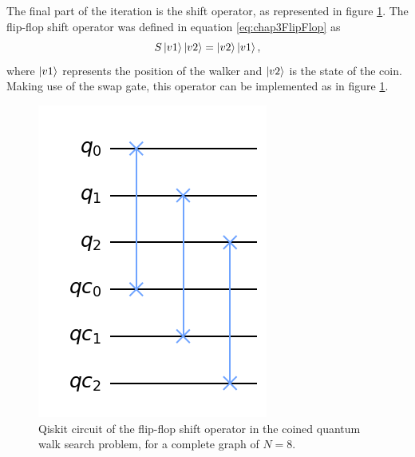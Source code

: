 \documentclass[../../dissertation.tex]{subfiles}
\begin{document}
The final part of the iteration is the shift operator, as represented in figure
\ref{fig:coinedQWSearchShiftCircuitQistkit}. The flip-flop shift operator was
defined in equation \eqref{eq:chap3FlipFlop} as
\begin{equation}
        S\ket{v1}\ket{v2} = \ket{v2}\ket{v1},
        \label{eq:chap4FlipFlop}
\end{equation}
where $\ket{v1}$ represents the position of the walker and $\ket{v2}$ is the
state of the coin. Making use of the swap gate, this operator can be
implemented as in figure \ref{fig:coinedQWSearchShiftCircuitQistkit}.
\begin{figure}[!h]
	\centering
	\includegraphics[scale=0.27]{img/Qiskit/CoinedQuantumWalk/Search/Circuits/CoinedSearchQiskitCircShift_N3_M4_S5.png}
	\caption{Qiskit circuit of the  flip-flop shift operator in the coined quantum walk search problem, for a complete graph of $N=8$.} 
	\label{fig:coinedQWSearchShiftCircuitQistkit}
\end{figure}\par
\end{document}
